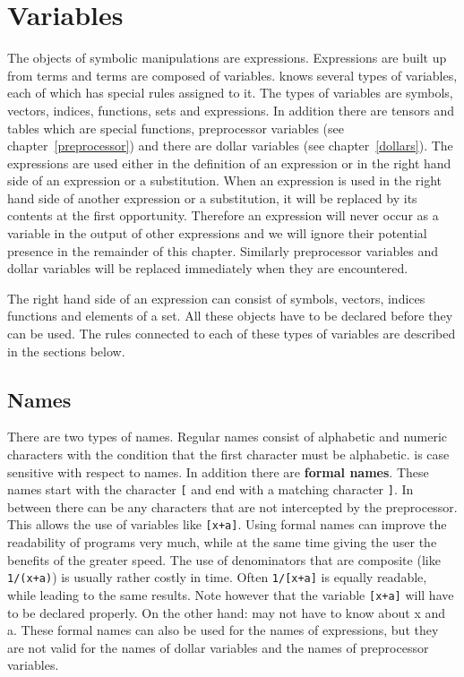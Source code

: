 
\chapter{Variables}
\label{variables}

The objects of symbolic manipulations are expressions. 
Expressions are built up from terms and terms are composed of 
variables. {\FORM} knows several types of variables, each 
of which has special rules assigned to it. The types of variables are 
symbols, vectors, indices, functions, sets and expressions. In addition 
there are tensors and tables which are special functions, preprocessor 
variables (see chapter~\ref{preprocessor}) 
and there are dollar variables (see 
chapter~\ref{dollars}). The expressions are used either in the definition 
of an expression or in the right hand side of an expression or a 
substitution. When an expression is used in the right hand side of another 
expression or a substitution, it will be replaced by its contents at the 
first opportunity. Therefore an expression will never occur as a variable 
in the output of other expressions and we will ignore their potential 
presence in the remainder of this chapter. Similarly preprocessor variables 
and  dollar variables will be replaced immediately when they are 
encountered.

The right hand side of an expression can consist of symbols, vectors, 
indices functions and elements of a set. All these objects have to be 
declared before they can be used. The rules 
connected to each of these types of variables are described in the 
sections below.

\section{Names}

There are two types of names. Regular 
names consist of alphabetic and numeric characters 
with the condition that the first character must be alphabetic. {\FORM} is 
case sensitive with respect to names. In addition there are {\bf formal 
names}. These names start with the character \verb:[: and end with a 
matching character \verb:]:. In between there can be any characters that 
are not intercepted by the preprocessor. This allows the use of variables 
like \verb:[x+a]:. Using formal names can improve the readability of 
programs very much, while at the same time giving the user the benefits of 
the greater speed. The use of denominators that are 
composite (like \verb:1/(x+a):) is usually rather costly in time. Often 
\verb:1/[x+a]: is equally readable, while leading to the same results. Note 
however that the variable \verb:[x+a]: will have to be declared properly. 
On the other hand: {\FORM} may not have to know about x and a. These formal 
names can also be used for the names of expressions, but they are not valid 
for the names of dollar variables and the names of 
preprocessor variables.

